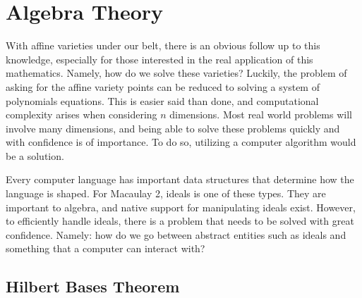 \clearpage{\thispagestyle{empty}}
\section{Algebra Theory}
\label{sec:algebra-theory}
With affine varieties under our belt, there is an obvious follow up to this knowledge, especially for those interested in the real application of this mathematics. Namely, how do we solve these varieties? Luckily, the problem of asking for the affine variety points can be reduced to solving a system of polynomials equations. This is easier said than done, and computational complexity arises when considering $n$ dimensions. Most real world problems will involve many dimensions, and being able to solve these problems quickly and with confidence is of importance. To do so, utilizing a computer algorithm would be a solution.

Every computer language has important data structures that determine how the language is shaped. For Macaulay 2, ideals is one of these types. They are important to algebra, and native support for manipulating ideals exist. However, to efficiently handle ideals, there is a problem that needs to be solved with great confidence. Namely: how do we go between abstract entities such as ideals and something that a computer can interact with?



\subsection{Hilbert Bases Theorem}
\label{ssec:hilbert-bases-theorem}


